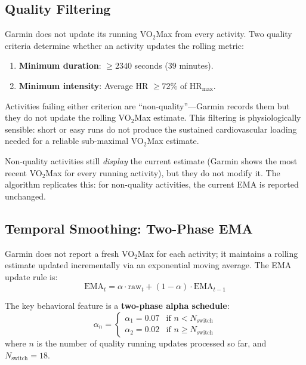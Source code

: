 \documentclass[11pt,a4paper]{article}
\begin{document}
\subsection{Quality Filtering}
\label{sec:quality}

Garmin does not update its running VO$_2$Max from every activity.
Two quality criteria determine whether an activity updates the rolling metric:
\begin{enumerate}[nosep]
    \item \textbf{Minimum duration}: $\geq 2340$ seconds (39 minutes).
    \item \textbf{Minimum intensity}: Average HR $\geq 72\%$ of HR$_{\text{max}}$.
\end{enumerate}

Activities failing either criterion are ``non-quality''---Garmin records them but they do not update the rolling VO$_2$Max estimate.
This filtering is physiologically sensible: short or easy runs do not produce the sustained cardiovascular loading needed for a reliable sub-maximal VO$_2$Max estimate.

Non-quality activities still \emph{display} the current estimate (Garmin shows the most recent VO$_2$Max for every running activity), but they do not modify it.
The algorithm replicates this: for non-quality activities, the current EMA is reported unchanged.


\subsection{Temporal Smoothing: Two-Phase EMA}
\label{sec:two-phase-alpha}

Garmin does not report a fresh VO$_2$Max for each activity; it maintains a rolling estimate updated incrementally via an exponential moving average.
The EMA update rule is:
\begin{equation}
\text{EMA}_t = \alpha \cdot \text{raw}_t + (1 - \alpha) \cdot \text{EMA}_{t-1}
\label{eq:ema}
\end{equation}

The key behavioral feature is a \textbf{two-phase alpha schedule}:
\begin{equation}
\alpha_n =
\begin{cases}
\alpha_1 = 0.07 & \text{if } n < N_{\text{switch}} \\
\alpha_2 = 0.02 & \text{if } n \geq N_{\text{switch}}
\end{cases}
\label{eq:two-phase-alpha}
\end{equation}
where $n$ is the number of quality running updates processed so far, and $N_{\text{switch}} = 18$.
\end{document}
